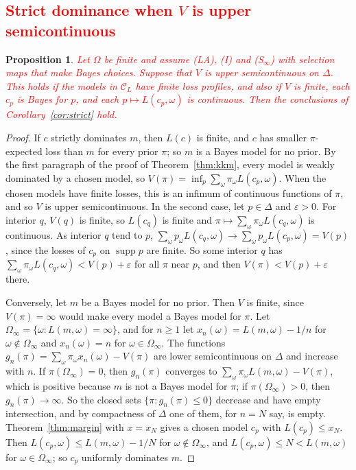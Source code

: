 \documentclass[11pt]{article}
\newtheorem{proposition}[theorem]{Proposition}
\theoremstyle{definition}
\theoremstyle{remark}
\newcommand{\C}{\mathcal C}
\newcommand{\supp}{\operatorname{supp}}
\begin{document}
\subsection{\textcolor{red}{Strict dominance when $V$ is upper semicontinuous}}
\begin{proposition}\label{prop:strict-general}
\textcolor{red}{Let $\Omega$ be finite and assume (LA), (I) and (S$_\infty$) with selection maps that make Bayes choices. Suppose that $V$ is upper semicontinuous on $\Delta$. This holds if the models in $\C_L$ have finite loss profiles, and also if $V$ is finite, each $c_p$ is Bayes for $p$, and each $p\mapsto L(c_p,\omega)$ is continuous. Then the conclusions of Corollary~\ref{cor:strict} hold.}
\end{proposition}
\begin{proof}
If $c$ strictly dominates $m$, then $L(c)$ is finite, and $c$ has smaller $\pi$-expected loss than $m$ for every prior $\pi$; so $m$ is a Bayes model for no prior. By the first paragraph of the proof of Theorem~\ref{thm:kkm}, every model is weakly dominated by a chosen model, so $V(\pi)=\inf_p\sum_\omega\pi_\omega L(c_p,\omega)$. When the chosen models have finite losses, this is an infimum of continuous functions of $\pi$, and so $V$ is upper semicontinuous. In the second case, let $p\in\Delta$ and $\varepsilon>0$. For interior $q$, $V(q)$ is finite, so $L(c_q)$ is finite and $\pi\mapsto\sum_\omega\pi_\omega L(c_q,\omega)$ is continuous. As interior $q$ tend to $p$, $\sum_\omega p_\omega L(c_q,\omega)\to\sum_\omega p_\omega L(c_p,\omega)=V(p)$, since the losses of $c_p$ on $\supp p$ are finite. So some interior $q$ has $\sum_\omega\pi_\omega L(c_q,\omega)<V(p)+\varepsilon$ for all $\pi$ near $p$, and then $V(\pi)<V(p)+\varepsilon$ there.

Conversely, let $m$ be a Bayes model for no prior. Then $V$ is finite, since $V(\pi)=\infty$ would make every model a Bayes model for $\pi$. Let $\Omega_\infty=\{\omega:L(m,\omega)=\infty\}$, and for $n\ge1$ let $x_n(\omega)=L(m,\omega)-1/n$ for $\omega\notin\Omega_\infty$ and $x_n(\omega)=n$ for $\omega\in\Omega_\infty$. The functions $g_n(\pi)=\sum_\omega\pi_\omega x_n(\omega)-V(\pi)$ are lower semicontinuous on $\Delta$ and increase with $n$. If $\pi(\Omega_\infty)=0$, then $g_n(\pi)$ converges to $\sum_\omega\pi_\omega L(m,\omega)-V(\pi)$, which is positive because $m$ is not a Bayes model for $\pi$; if $\pi(\Omega_\infty)>0$, then $g_n(\pi)\to\infty$. So the closed sets $\{\pi:g_n(\pi)\le0\}$ decrease and have empty intersection, and by compactness of $\Delta$ one of them, for $n=N$ say, is empty. Theorem~\ref{thm:margin} with $x=x_N$ gives a chosen model $c_p$ with $L(c_p)\le x_N$. Then $L(c_p,\omega)\le L(m,\omega)-1/N$ for $\omega\notin\Omega_\infty$, and $L(c_p,\omega)\le N<L(m,\omega)$ for $\omega\in\Omega_\infty$; so $c_p$ uniformly dominates $m$.
\end{proof}
\end{document}
